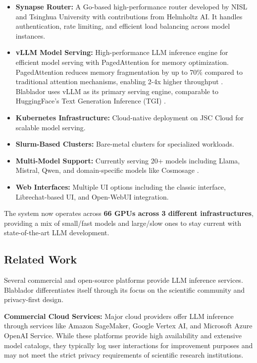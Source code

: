 \documentclass[10pt,conference]{IEEEtran}
\begin{document}
\begin{itemize}
    \item \textbf{Synapse Router:} A Go-based high-performance router developed by NISL and Tsinghua University \cite{synapse} with contributions from Helmholtz AI. It handles authentication, rate limiting, and efficient load balancing across model instances.
    \item \textbf{vLLM Model Serving:} High-performance LLM inference engine \cite{vllm} for efficient model serving with PagedAttention for memory optimization. PagedAttention reduces memory fragmentation by up to 70\% compared to traditional attention mechanisms, enabling 2-4x higher throughput \cite{vllm}. Blablador uses vLLM as its primary serving engine, comparable to HuggingFace's Text Generation Inference (TGI) \cite{tgi}.
    \item \textbf{Kubernetes Infrastructure:} Cloud-native deployment on JSC Cloud for scalable model serving.
    \item \textbf{Slurm-Based Clusters:} Bare-metal clusters for specialized workloads.
    \item \textbf{Multi-Model Support:} Currently serving 20+ models including Llama, Mistral, Qwen, and domain-specific models like Cosmosage \cite{dehaan2024cosmosage}.
    \item \textbf{Web Interfaces:} Multiple UI options including the classic interface, Librechat-based UI, and Open-WebUI integration.
\end{itemize}

The system now operates across \textbf{66 GPUs across 3 different infrastructures}, providing a mix of small/fast models and large/slow ones to stay current with state-of-the-art LLM development.

\subsection{Related Work}

Several commercial and open-source platforms provide LLM inference services. Blablador differentiates itself through its focus on the scientific community and privacy-first design.

\textbf{Commercial Cloud Services:} Major cloud providers offer LLM inference through services like Amazon SageMaker, Google Vertex AI, and Microsoft Azure OpenAI Service. While these platforms provide high availability and extensive model catalogs, they typically log user interactions for improvement purposes and may not meet the strict privacy requirements of scientific research institutions.
\end{document}
